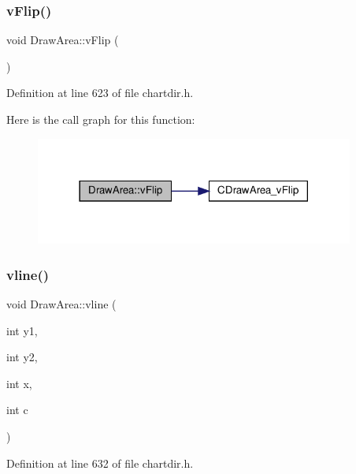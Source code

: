 \subsubsection{\texorpdfstring{v\+Flip()}{vFlip()}}
{\footnotesize\ttfamily void Draw\+Area\+::v\+Flip (\begin{DoxyParamCaption}{ }\end{DoxyParamCaption})\hspace{0.3cm}{\ttfamily [inline]}}



Definition at line 623 of file chartdir.\+h.

Here is the call graph for this function\+:
\nopagebreak
\begin{figure}[H]
\begin{center}
\leavevmode
\includegraphics[width=297pt]{class_draw_area_a82add495d3776857c69b264055c00362_cgraph}
\end{center}
\end{figure}
\mbox{\label{class_draw_area_ac679f2b836e67e68994b7977d4881383}} 
\subsubsection{\texorpdfstring{vline()}{vline()}}
{\footnotesize\ttfamily void Draw\+Area\+::vline (\begin{DoxyParamCaption}\item[{int}]{y1,  }\item[{int}]{y2,  }\item[{int}]{x,  }\item[{int}]{c }\end{DoxyParamCaption})\hspace{0.3cm}{\ttfamily [inline]}}



Definition at line 632 of file chartdir.\+h.

